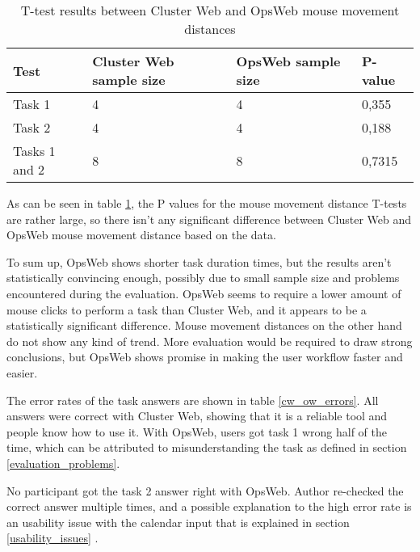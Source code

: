\begin{table}[!ht]
\def\arraystretch{1.1}%
    \begin{center}
    \caption{T-test results between Cluster Web and OpsWeb mouse movement distances}
    \label{cw_ow_distances_t_test}
    \begin{tabular}{| l | l | l | l | }
    \hline
    Test & Cluster Web sample size & OpsWeb sample size  & P-value   \\
    \hline
    Task 1 & 4 & 4 & 0,355 \\
    Task 2 & 4 & 4 & 0,188 \\
    Tasks 1 and 2 & 8 & 8 & 0,7315 \\
    \hline
    \end{tabular}
    \end{center}
\end{table}

As can be seen in table \ref{cw_ow_distances_t_test}, the P values for the mouse movement distance T-tests are rather large, so there isn't any significant difference between Cluster Web and OpsWeb mouse movement distance based on the data.

To sum up, OpsWeb shows shorter task duration times, but the results aren't statistically convincing enough, possibly due to small sample size and problems encountered during the evaluation. OpsWeb seems to require a lower amount of mouse clicks to perform a task than Cluster Web, and it appears to be a statistically significant difference. Mouse movement distances on the other hand do not show any kind of trend. More evaluation would be required to draw strong conclusions, but OpsWeb shows promise in making the user workflow faster and easier.

The error rates of the task answers are shown in table \ref{cw_ow_errors}. All answers were correct with Cluster Web, showing that it is a reliable tool and people know how to use it. With OpsWeb, users got task 1 wrong half of the time, which can be attributed to misunderstanding the task as defined in section \ref{evaluation_problems}. 

No participant got the task 2 answer right with OpsWeb. Author re-checked the correct answer multiple times, and a possible explanation to the high error rate is an usability issue with the calendar input that is explained in section \ref{usability_issues} .

